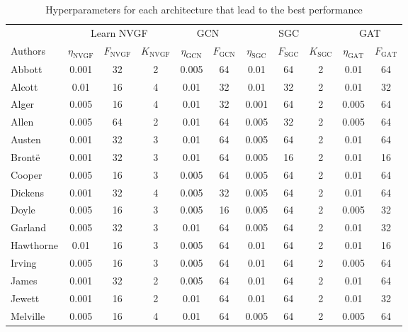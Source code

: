 \begin{table*}
    \caption{Hyperparameters for each architecture that lead to the best performance}
    \label{tab:app:allAuthors:hParams}
    \centering
    \small
    \begin{tabular}{l|ccc|cc|ccc|cc}
        \toprule
        & \multicolumn{3}{c|}{Learn NVGF} & \multicolumn{2}{c|}{GCN \cite{Kipf2017-GCN}} & \multicolumn{3}{c|}{SGC \cite{Weinberger2019-SGC}} & \multicolumn{2}{c}{GAT \cite{Velickovic2018-GAT}} \\
        Authors & $\eta_{\text{NVGF}}$ & $F_{\text{NVGF}}$ & $K_{\text{NVGF}}$ & $\eta_{\text{GCN}}$ & $F_{\text{GCN}}$ & $\eta_{\text{SGC}}$ & $F_{\text{SGC}}$ & $K_{\text{SGC}}$ & $\eta_{\text{GAT}}$ & $F_{\text{GAT}}$ \\
        \midrule
        Abbott & 0.001 & 32 & 2 & 0.005 & 64 & 0.01 & 64 & 2 & 0.01 & 64 \\
        Alcott & 0.01 & 16 & 4 & 0.01 & 32 & 0.01 & 32 & 2 & 0.01 & 32 \\
        Alger  & 0.005 & 16 & 4 & 0.01 & 32 & 0.001 & 64 & 2 & 0.005 & 64 \\
        Allen & 0.005 & 64 & 2 & 0.01 & 64 & 0.005 & 32 & 2 & 0.005 & 64 \\
        Austen & 0.001 & 32 & 3 & 0.01 & 64 & 0.005 & 64 & 2 & 0.01 & 64\\
        Bront\"{e} & 0.001 & 32 & 3 & 0.01 & 64 & 0.005 & 16 & 2 & 0.01 & 16 \\
        Cooper & 0.005 & 16 & 3 & 0.005 & 64 & 0.005 & 64 & 2 & 0.01 & 64 \\
        Dickens & 0.001 & 32 & 4 & 0.005 & 32 & 0.005 & 64 & 2 & 0.01 & 64 \\
        Doyle & 0.005 & 16 & 3 & 0.005 & 16 & 0.005 & 64 & 2 & 0.005 & 32 \\
        Garland & 0.005 & 32 & 3 & 0.01 & 64 & 0.005 & 64 & 2 & 0.01 & 32 \\
        Hawthorne & 0.01 & 16 & 3 & 0.005 & 64 & 0.01 & 64 & 2 & 0.01 & 16 \\
        Irving & 0.005 & 16 & 3 & 0.005 & 64 & 0.01 & 64 & 2 & 0.005 & 64 \\
        James & 0.001 & 32 & 2 & 0.005 & 64 & 0.01 & 64 & 2 & 0.01 & 64 \\
        Jewett & 0.001 & 16 & 2 & 0.01 & 64 & 0.01 & 64 & 2 & 0.01 & 32 \\
        Melville & 0.005 & 16 & 4 & 0.01 & 64 & 0.005 & 64 & 2 & 0.005 & 64  \\

\end{tabular}
\end{table*}
